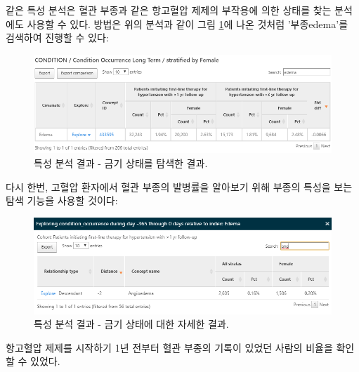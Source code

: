 \documentclass[10.5pt]{book}
\theoremstyle{definition}
\theoremstyle{definition}
\theoremstyle{definition}
\theoremstyle{remark}
\begin{document}
같은 특성 분석은 혈관 부종과 같은 항고혈압 제제의 부작용에 의한 상태를
찾는 분석에도 사용할 수 있다. 방법은 위의 분석과 같이 그림
\ref{fig:atlasCharacterizationResultsContra}에 나온 것처럼 '부종edema'를
검색하여 진행할 수 있다:

\begin{figure}

{\centering \includegraphics[width=1\linewidth]{images/Characterization/atlasCharacterizationResultsContra} 

}

\caption{특성 분석 결과 - 금기 상태를 탐색한 결과.}\label{fig:atlasCharacterizationResultsContra}
\end{figure}

다시 한번, 고혈압 환자에서 혈관 부종의 발병률을 알아보기 위해 부종의
특성을 보는 탐색 기능을 사용할 것이다:

\begin{figure}

{\centering \includegraphics[width=1\linewidth]{images/Characterization/atlasCharacterizationResultsContraExplore} 

}

\caption{특성 분석 결과 - 금기 상태에 대한 자세한 결과.}\label{fig:atlasCharacterizationResultsContraExplore}
\end{figure}

항고혈압 제제를 시작하기 1년 전부터 혈관 부종의 기록이 있었던 사람의
비율을 확인할 수 있었다.
\end{document}
